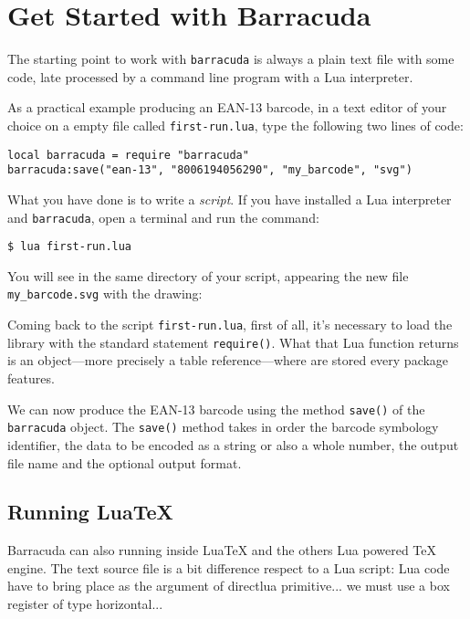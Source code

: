 \documentclass{article}
\newcommand{\code}[1]{\texttt{#1}}
\newcommand{\brcd}{\code{barracuda}}
\begin{document}
\section{Get Started with Barracuda}
\label{secEnter}

The starting point to work with \brcd{} is always a plain text file with some
code, late processed by a command line program with a Lua interpreter.

As a practical example producing an EAN-13 barcode, in a text editor of your
choice on a empty file called \code{first-run.lua}, type the following two lines
of code:
\medskip
\begin{Verbatim}[label=\footnotesize\code{first-run.lua}]
local barracuda = require "barracuda"
barracuda:save("ean-13", "8006194056290", "my_barcode", "svg")
\end{Verbatim}

What you have done is to write a \emph{script}. If you have installed a Lua
interpreter and \brcd{}, open a terminal and run the command:
\begin{Verbatim}
$ lua first-run.lua
\end{Verbatim}

You will see in the same directory of your script, appearing the new file
\code{my\_barcode.svg} with the drawing:
\begin{center}
\end{center}

Coming back to the script \code{first-run.lua}, first of all, it's necessary to
load the library with the standard statement \code{require()}. What that Lua
function returns is an object---more precisely a table reference---where are
stored every package features.

We can now produce the EAN-13 barcode using the method \code{save()} of the
\brcd{} object. The \code{save()} method takes in order the barcode symbology
identifier, the data to be encoded as a string or also a whole number, the
output file name and the optional output format.




\subsection{Running Lua\TeX}

Barracuda can also running inside Lua\TeX{} and the others Lua powered \TeX{}
engine. The text source file is a bit difference respect to a Lua script: Lua
code have to bring place as the argument of directlua primitive... we must use
a box register of type horizontal...
\end{document}
